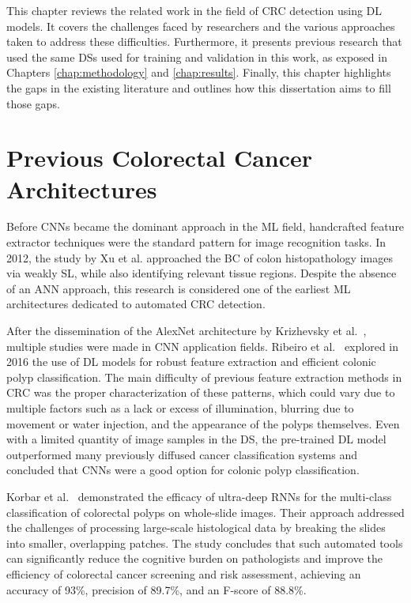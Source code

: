 \label{chap:related}
This chapter reviews the related work in the field of \gls{CRC} detection using \gls{DL} models. It covers the challenges faced by researchers and the various approaches taken to address these difficulties. Furthermore, it presents previous research that used the same \glspl{DS} used for training and validation in this work, as exposed in Chapters \ref{chap:methodology} and \ref{chap:results}. Finally, this chapter highlights the gaps in the existing literature and outlines how this dissertation aims to fill those gaps.

\section{Previous Colorectal Cancer Architectures}
\label{sec_prev_src_arch}

Before \glspl{CNN} became the dominant approach in the \gls{ML} field, handcrafted feature extractor techniques were the standard pattern for image recognition tasks. In 2012, the study by Xu et al. \cite{multipleClusterColon} approached the \gls{BC} of colon histopathology images via weakly \gls{SL}, while also identifying relevant tissue regions. Despite the absence of an \gls{ANN} approach, this research is considered one of the earliest \gls{ML} architectures dedicated to automated \gls{CRC} detection.

After the dissemination of the AlexNet architecture by Krizhevsky et al.~\cite{DBLP:conf/nips/KrizhevskySH12}, multiple studies were made in \gls{CNN} application fields. Ribeiro et al.~\cite{RibeiroDeepLearning} explored in 2016 the use of \gls{DL} models for robust feature extraction and efficient colonic polyp classification. The main difficulty of previous feature extraction methods in \gls{CRC} was the proper characterization of these patterns, which could vary due to multiple factors such as a lack or excess of illumination, blurring due to movement or water injection, and the appearance of the polyps themselves. Even with a limited quantity of image samples in the \gls{DS}, the pre-trained \gls{DL} model outperformed many previously diffused cancer classification systems and concluded that \glspl{CNN} were a good option for colonic polyp classification.

Korbar et al.~\cite{korbar2017deeplearningclassificationcolorectalpolyps} demonstrated the efficacy of ultra-deep \glspl{RNN} for the multi-class classification of colorectal polyps on whole-slide images. Their approach addressed the challenges of processing large-scale histological data by breaking the slides into smaller, overlapping patches. The study concludes that such automated tools can significantly reduce the cognitive burden on pathologists and improve the efficiency of colorectal cancer screening and risk assessment, achieving an accuracy of 93\%, precision of 89.7\%, and an F-score of 88.8\%.

